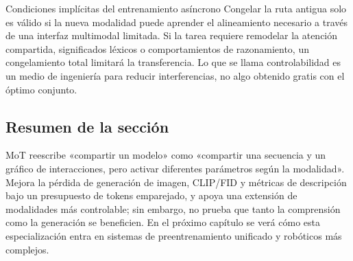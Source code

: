 \begin{warningbox}{Condiciones implícitas del entrenamiento asíncrono}
Congelar la ruta antigua solo es válido si la nueva modalidad puede aprender el alineamiento necesario a través de una interfaz multimodal limitada. Si la tarea requiere remodelar la atención compartida, significados léxicos o comportamientos de razonamiento, un congelamiento total limitará la transferencia. Lo que se llama controlabilidad es un medio de ingeniería para reducir interferencias, no algo obtenido gratis con el óptimo conjunto.
\end{warningbox}


\subsection{Resumen de la sección}

MoT reescribe «compartir un modelo» como «compartir una secuencia y un gráfico de interacciones, pero activar diferentes parámetros según la modalidad». Mejora la pérdida de generación de imagen, CLIP/FID y métricas de descripción bajo un presupuesto de tokens emparejado, y apoya una extensión de modalidades más controlable; sin embargo, no prueba que tanto la comprensión como la generación se beneficien. En el próximo capítulo se verá cómo esta especialización entra en sistemas de preentrenamiento unificado y robóticos más complejos.


